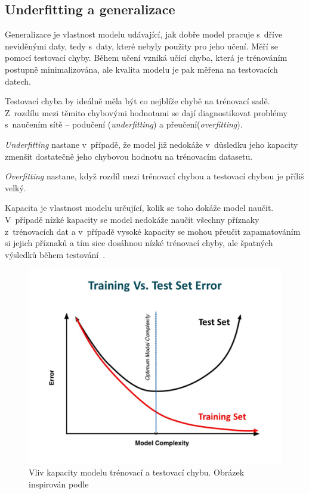 

\subsection{Underfitting a generalizace}
Generalizace je vlastnost modelu udávající, jak dobře model pracuje s~dříve neviděnými daty, tedy s~daty, které nebyly použity pro jeho učení. Měří se pomocí testovací chyby. Během učení vzniká učící chyba, která je trénováním postupně minimalizována, ale kvalita modelu je pak měřena na testovacích datech. 

Testovací chyba by ideálně měla být co nejblíže chybě na trénovací sadě. Z~rozdílu mezi těmito chybovými hodnotami se dají diagnostikovat problémy s~naučením sítě -- podučení (\textit{underfitting}) a přeučení(\textit{overfitting}).

\textit{Underfitting} nastane v~případě, že model již nedokáže v~důsledku jeho kapacity zmenšit dostatečně jeho chybovou hodnotu na trénovacím datasetu.

\textit{Overfitting} nastane, když rozdíl mezi trénovací chybou a testovací chybou je příliš velký.

Kapacita je vlastnost modelu určující, kolik se toho dokáže model naučit. V~případě nízké kapacity se model nedokáže naučit všechny příznaky z~trénovacích dat a v~případě vysoké kapacity se mohou přeučit zapamatováním si jejich příznaků a tím sice dosáhnou nízké trénovací chyby, ale špatných výsledků během testování~\cite{mitdeeplearning}.
\begin{figure}[H]
    \centering
    \includegraphics[scale=0.3]{obrazky-figures/capacity_vs_error.jpg}
    \caption{\label{fig:gradientdescent}Vliv kapacity modelu trénovací a testovací chybu. Obrázek inspirován podle~\cite{trainingvstesterror}}
\end{figure}

